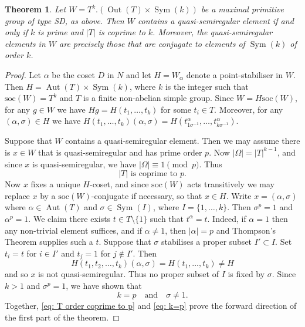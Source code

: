 \documentclass{article}
\newtheorem{thm}{Theorem}[section]
\theoremstyle{remark}
\theoremstyle{definition}
\newcounter{claim}[thm]
\DeclareMathOperator{\Sym}{Sym}
\DeclareMathOperator{\Aut}{Aut}
\DeclareMathOperator{\Out}{Out}
\newcommand{\soc}{\mathrm{soc}}
\newcommand{\qsr}{quasi-semiregular}
\newcommand{\qsre}{quasi-semiregular element}
\newcommand{\qsres}{quasi-semiregular elements}
\begin{document}
 
\begin{thm}
\label{thm: sd groups}
Let  $W=T^k.(\Out(T)\times \Sym(k))$ be a maximal primitive group of  type SD, as above. 
Then $W$ contains a {\qsre} if and only if $k$ is prime and $|T|$ is coprime to $k$. Moreover, the {\qsres} in $W$ are precisely those that are conjugate to elements of $\Sym(k)$ of order $k$.
\end{thm}
\begin{proof}
Let $\alpha$  be the coset $D$ in $N$ and let $H=W_\alpha$ denote a point-stabiliser in $W$. Then $H= \Aut(T) \times \Sym(k)$, where $k$ is the integer such that $\soc(W)=T^k$ and $T$ is a finite non-abelian simple group. 
Since $W=H\soc(W)$, for any $g\in W$ we have $Hg=H(t_1,\ldots,t_k)$ for some $t_i\in T$. Moreover, for any $(\alpha,\sigma)\in H$ we  have $H(t_1,\ldots,t_k)(\alpha,\sigma)=H(t_{1\sigma^{-1}}^\alpha,\ldots,t_{k\sigma^{-1}}^\alpha)$.

Suppose that $W$ contains a {\qsre}. Then we may assume there is $x\in W$ that is {\qsr} and  has prime order $p$. Now $|\Omega|=|T|^{k-1}$, and since $x$ is {\qsr}, we have $|\Omega|\equiv 1\pmod{p}$. Thus 
\begin{equation}
    \label{eq: T order coprime to p}
    |T| \text{ is coprime to  }p.
\end{equation}
Now $x$ fixes a unique $H$-coset, and since $\soc(W)$ acts transitively we may replace $x$ by a $\soc(W)$-conjugate if necessary, so that $x\in H$.
Write $x = ( \alpha, \sigma)$ where $\alpha\in\Aut(T)$
and $\sigma \in \Sym(I)$, where $I=\{1,\ldots,k\}$. Then $\sigma^p=1$ and $\alpha^p=1$.  We claim there exists $t\in T\setminus\{1\}$ such that $t^\alpha =t$. Indeed, if $\alpha=1$ then any non-trivial element suffices, and if $\alpha\neq 1$, then $|\alpha|=p$ and Thompson's Theorem \cite[Theorem 1]{Thompson} supplies such a $t$.  Suppose that $\sigma$ stabilises a proper subset $I' \subset I$. Set $t_i = t$ for $i\in I'$ and $t_j = 1$ for $j\notin I'$. Then
$$
H(t_1,t_2,\ldots,t_k) (\alpha,\sigma) = H(t_1,\ldots,t_k) \neq H
$$
and so $x$ is not {\qsr}. Thus no proper subset of $I$ is fixed by $\sigma$. Since $k>1$ and $\sigma^p=1$, we have  shown that  
\begin{equation}
    \label{eq: k=p}
    k=p \quad \text{and} \quad \sigma \neq 1.
\end{equation}
Together,  \eqref{eq: T order coprime to p} and \eqref{eq: k=p}   prove the forward direction of the first part  of  the  theorem.






\end{proof}
\end{document}
